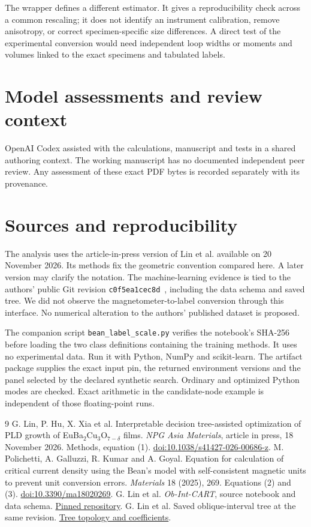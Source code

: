 \documentclass[11pt]{article}
\begin{document}
The wrapper defines a different estimator. It gives a reproducibility check across a common rescaling; it does not identify an instrument calibration, remove anisotropy, or correct specimen-specific size differences. A direct test of the experimental conversion would need independent loop widths or moments and volumes linked to the exact specimens and tabulated labels.

\section*{Model assessments and review context}
OpenAI Codex assisted with the calculations, manuscript and tests in a shared authoring context. The working manuscript has no documented independent peer review. Any assessment of these exact PDF bytes is recorded separately with its provenance.
\newpage
\section*{Sources and reproducibility}
The analysis uses the article-in-press version of Lin et al. available on 20 November 2026. Its methods fix the geometric convention compared here. A later version may clarify the notation. The machine-learning evidence is tied to the authors' public Git revision \texttt{c0f5ea1cec8d}~\cite{code}, including the data schema and saved tree. We did not observe the magnetometer-to-label conversion through this interface. No numerical alteration to the authors' published dataset is proposed.

The companion script \texttt{bean\_label\_scale.py} verifies the notebook's SHA-256 before loading the two class definitions containing the training methods. It uses no experimental data. Run it with Python, NumPy and scikit-learn. The artifact package supplies the exact input pin, the returned environment versions and the panel selected by the declared synthetic search. Ordinary and optimized Python modes are checked. Exact arithmetic in the candidate-node example is independent of those floating-point runs.

\begin{thebibliography}{9}
 G. Lin, P. Hu, X. Xia et al. Interpretable decision tree-assisted optimization of PLD growth of EuBa$_2$Cu$_3$O$_{7-\delta}$ films. \emph{NPG Asia Materials}, article in press, 18 November 2026. Methods, equation (1). \href{https://doi.org/10.1038/s41427-026-00686-z}{doi:10.1038/s41427-026-00686-z}.
 M. Polichetti, A. Galluzzi, R. Kumar and A. Goyal. Equation for calculation of critical current density using the Bean's model with self-consistent magnetic units to prevent unit conversion errors. \emph{Materials} 18 (2025), 269. Equations (2) and (3). \href{https://doi.org/10.3390/ma18020269}{doi:10.3390/ma18020269}.
 G. Lin et al. \emph{Ob-Int-CART}, source notebook and data schema. \href{https://github.com/DavidLin628/Ob-Int-CART/tree/c0f5ea1cec8dba55a54039564b5e8104b8c3a69c}{Pinned repository}.
 G. Lin et al. Saved oblique-interval tree at the same revision. \href{https://github.com/DavidLin628/Ob-Int-CART/blob/c0f5ea1cec8dba55a54039564b5e8104b8c3a69c/Ob_Int_CART.dot}{Tree topology and coefficients}.
\end{thebibliography}
\end{document}
